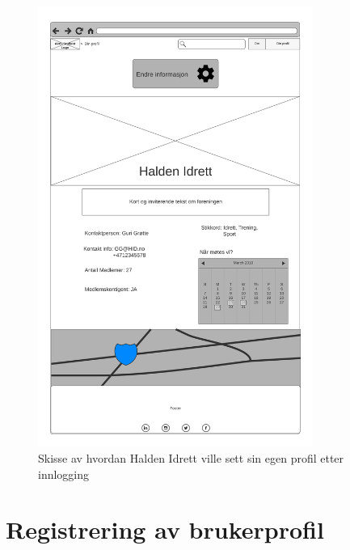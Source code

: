 \begin{figure}[H]
\centering
\includegraphics[width=0.8\textwidth]{Illustrasjoner/Skisser/2.0/2-9-org-innlogget-profil.png}
\caption{Skisse av hvordan Halden Idrett ville sett sin egen profil etter innlogging}
\label{vedlegg:2-9-innlogget-org}
\end{figure}

\section{Registrering av brukerprofil}

